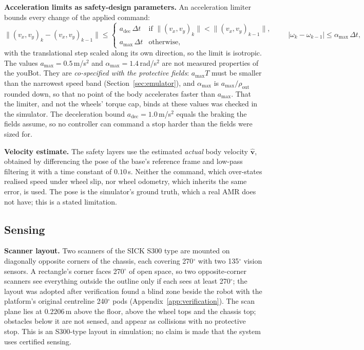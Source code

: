 \documentclass[sensors,article,submit,moreauthors]{Definitions/mdpi}
\begin{document}
\textbf{Acceleration limits as safety-design parameters.} An acceleration limiter bounds every change of the applied command:
\begin{equation}
\big\|(v_x,v_y)_{k} - (v_x,v_y)_{k-1}\big\| \le
\begin{cases} a_{\text{dec}}\,\Delta t & \text{if } \|(v_x,v_y)_{k}\| < \|(v_x,v_y)_{k-1}\|,\\
a_{\max}\,\Delta t & \text{otherwise,}\end{cases}
\qquad |\omega_k - \omega_{k-1}| \le \alpha_{\max}\,\Delta t,
\label{eq:limiter}
\end{equation}
with the translational step scaled along its own direction, so the limit is isotropic. The values $a_{\max} = 0.5$\,m/s$^2$ and $\alpha_{\max} = 1.4$\,rad/s$^2$ are not measured properties of the youBot. They are \emph{co-specified with the protective fields}: $a_{\max} T$ must be smaller than the narrowest speed band (Section~\ref{sec:emulator}), and $\alpha_{\max}$ is $a_{\max}/\rho_{\text{out}}$ rounded down, so that no point of the body accelerates faster than $a_{\max}$. That the limiter, and not the wheels' torque cap, binds at these values was checked in the simulator. The deceleration bound $a_{\text{dec}} = 1.0$\,m/s$^2$ equals the braking the fields assume, so no controller can command a stop harder than the fields were sized for.

\textbf{Velocity estimate.} The safety layers use the estimated \emph{actual} body velocity $\hat{\mathbf{v}}$, obtained by differencing the pose of the base's reference frame and low-pass filtering it with a time constant of $0.10$\,s. Neither the command, which over-states realised speed under wheel slip, nor wheel odometry, which inherits the same error, is used. The pose is the simulator's ground truth, which a real AMR does not have; this is a stated limitation.

\subsection{Sensing}\label{sec:sensing}

\textbf{Scanner layout.} Two scanners of the SICK S300 type are mounted on diagonally opposite corners of the chassis, each covering 270$^\circ$ with two 135$^\circ$ vision sensors. A rectangle's corner faces 270$^\circ$ of open space, so two opposite-corner scanners see everything outside the outline only if each sees at least 270$^\circ$; the layout was adopted after verification found a blind zone beside the robot with the platform's original centreline 240$^\circ$ pods (Appendix~\ref{app:verification}). The scan plane lies at $0.2206$\,m above the floor, above the wheel tops and the chassis top; obstacles below it are not sensed, and appear as collisions with no protective stop. This is an S300-type layout in simulation; no claim is made that the system uses certified sensing.
\end{document}
